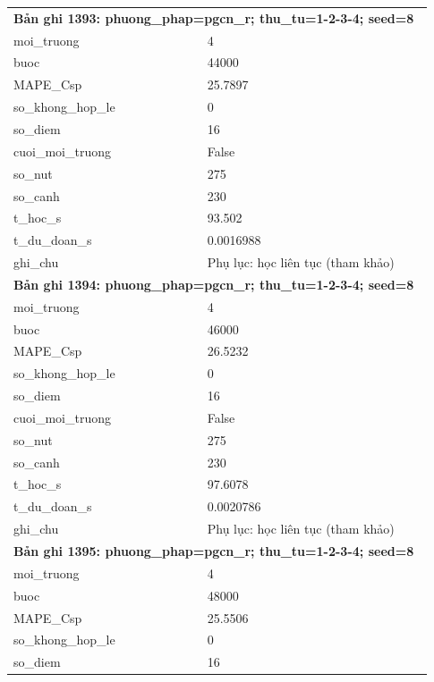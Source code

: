 \begin{longtable}{p{0.43\linewidth}p{0.50\linewidth}}
\midrule
\multicolumn{2}{p{0.95\linewidth}}{\textbf{Bản ghi 1393: phuong\_phap=pgcn\_r; thu\_tu=1-2-3-4; seed=8}} \\
moi\_\allowbreak truong & 4 \\
buoc & 44000 \\
MAPE\_\allowbreak Csp & 25.7897 \\
so\_\allowbreak khong\_\allowbreak hop\_\allowbreak le & 0 \\
so\_\allowbreak diem & 16 \\
cuoi\_\allowbreak moi\_\allowbreak truong & False \\
so\_\allowbreak nut & 275 \\
so\_\allowbreak canh & 230 \\
t\_\allowbreak hoc\_\allowbreak s & 93.502 \\
t\_\allowbreak du\_\allowbreak doan\_\allowbreak s & 0.0016988 \\
ghi\_\allowbreak chu & Phụ lục: học liên tục (tham khảo) \\
\midrule
\multicolumn{2}{p{0.95\linewidth}}{\textbf{Bản ghi 1394: phuong\_phap=pgcn\_r; thu\_tu=1-2-3-4; seed=8}} \\
moi\_\allowbreak truong & 4 \\
buoc & 46000 \\
MAPE\_\allowbreak Csp & 26.5232 \\
so\_\allowbreak khong\_\allowbreak hop\_\allowbreak le & 0 \\
so\_\allowbreak diem & 16 \\
cuoi\_\allowbreak moi\_\allowbreak truong & False \\
so\_\allowbreak nut & 275 \\
so\_\allowbreak canh & 230 \\
t\_\allowbreak hoc\_\allowbreak s & 97.6078 \\
t\_\allowbreak du\_\allowbreak doan\_\allowbreak s & 0.0020786 \\
ghi\_\allowbreak chu & Phụ lục: học liên tục (tham khảo) \\
\midrule
\multicolumn{2}{p{0.95\linewidth}}{\textbf{Bản ghi 1395: phuong\_phap=pgcn\_r; thu\_tu=1-2-3-4; seed=8}} \\
moi\_\allowbreak truong & 4 \\
buoc & 48000 \\
MAPE\_\allowbreak Csp & 25.5506 \\
so\_\allowbreak khong\_\allowbreak hop\_\allowbreak le & 0 \\
so\_\allowbreak diem & 16 \\

\end{longtable}
